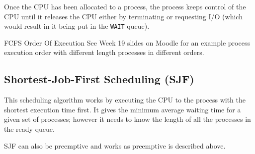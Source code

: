 Once the CPU has been allocated to a process, the process keeps control of the CPU until it releases the CPU either by terminating or requesting I/O (which would result in it being put in the \verb|WAIT| queue).

\begin{link}{FCFS Order Of Execution}
See Week 19 slides on Moodle for an example process execution order with different length processes in different orders.
\end{link}

\subsection*{Shortest-Job-First Scheduling (SJF)}
This scheduling algorithm works by executing the CPU to the process with the shortest execution time first. It gives the minimum average waiting time for a given set of processes; however it needs to know the length of all the processes in the ready queue. 

SJF can also be preemptive and works as preemptive is described above. 